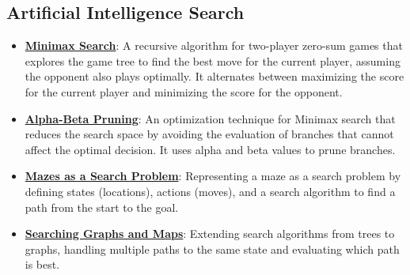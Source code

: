 \documentclass{article}%
\begin{document}
\subsection{Artificial Intelligence Search}%
\label{subsec:ArtificialIntelligenceSearch}%
\begin{itemize}[leftmargin=*]%
\item \href{https://purdue.brightspace.com/d2l/common/assets/pdfjs-d2l-dist/1.0.14-legacy/web/viewer.html?file=\%2Fcontent\%2Fenforced\%2F1095467-wl.202510.CS.24300.001\%2F02L2-Intro.pdf\%3Fou\%3D1095467\&lang=en-us\&container=d2l-fileviewer-rendered-pdf\&fullscreen=d2l-fileviewer-rendered-pdf-dialog\&height=667#page=22}{\textbf{Minimax Search}}: A recursive algorithm for two-player zero-sum games that explores the game tree to find the best move for the current player, assuming the opponent also plays optimally. It alternates between maximizing the score for the current player and minimizing the score for the opponent.%
\item \href{https://purdue.brightspace.com/d2l/common/assets/pdfjs-d2l-dist/1.0.14-legacy/web/viewer.html?file=\%2Fcontent\%2Fenforced\%2F1095467-wl.202510.CS.24300.001\%2F02L2-Intro.pdf\%3Fou\%3D1095467\&lang=en-us\&container=d2l-fileviewer-rendered-pdf\&fullscreen=d2l-fileviewer-rendered-pdf-dialog\&height=667#page=23}{\textbf{Alpha-Beta Pruning}}: An optimization technique for Minimax search that reduces the search space by avoiding the evaluation of branches that cannot affect the optimal decision. It uses alpha and beta values to prune branches.%
\item \href{https://purdue.brightspace.com/d2l/common/assets/pdfjs-d2l-dist/1.0.14-legacy/web/viewer.html?file=\%2Fcontent\%2Fenforced\%2F1095467-wl.202510.CS.24300.001\%2F14L1-DepthFS.pdf\%3Fou\%3D1095467\&lang=en-us\&container=d2l-fileviewer-rendered-pdf\&fullscreen=d2l-fileviewer-rendered-pdf-dialog\&height=667#page=16}{\textbf{Mazes as a Search Problem}}: Representing a maze as a search problem by defining states (locations), actions (moves), and a search algorithm to find a path from the start to the goal.%
\item \href{https://purdue.brightspace.com/d2l/common/assets/pdfjs-d2l-dist/1.0.14-legacy/web/viewer.html?file=\%2Fcontent\%2Fenforced\%2F1095467-wl.202510.CS.24300.001\%2F14L1-DepthFS.pdf\%3Fou\%3D1095467\&lang=en-us\&container=d2l-fileviewer-rendered-pdf\&fullscreen=d2l-fileviewer-rendered-pdf-dialog\&height=667#page=25}{\textbf{Searching Graphs and Maps}}: Extending search algorithms from trees to graphs, handling multiple paths to the same state and evaluating which path is best.%

\end{itemize}
\end{document}
